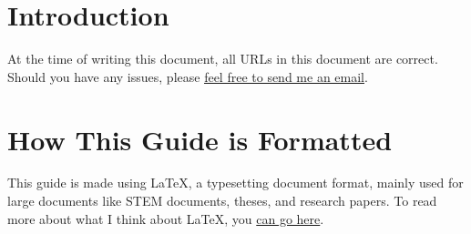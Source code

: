\maketitle              %
\newpage                %
\tableofcontents        %
\newpage                %

\section{Introduction}

At the time of writing this document, all URLs in this document are correct.
Should you have any issues, please
\underline{\href{mailto:HusseinEsmailContact@gmail.com}
{feel free to send me an email}}.

\section{How This Guide is Formatted}
This guide is made using \LaTeX{}, a typesetting document format, mainly used
for large documents like STEM documents, theses, and research papers. To read
more about what I think about \LaTeX{}, you
\href{https://husseinesmail.xyz/articles/is-latex-better.html}{can go here}.


